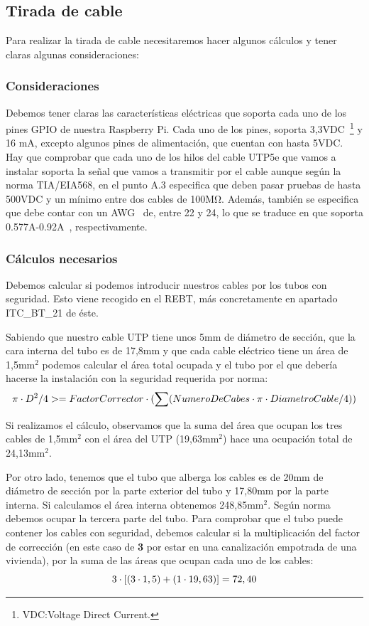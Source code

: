 \subsection{Tirada de cable}
Para realizar la tirada de cable necesitaremos hacer algunos cálculos y tener claras algunas consideraciones:

\subsubsection{Consideraciones}
Debemos tener claras las características eléctricas que soporta cada uno de los pines GPIO de nuestra Raspberry Pi. Cada uno de los pines, soporta 3,3VDC~\footnote{VDC:Voltage Direct Current.} y 16 mA, excepto algunos pines de alimentación, que cuentan con hasta 5VDC.
Hay que comprobar que cada uno de los hilos del cable UTP5e que vamos a instalar soporta la señal que vamos a transmitir por el cable aunque según la norma TIA/EIA568, en el punto A.3 especifica que deben pasar pruebas de hasta 500VDC y un mínimo entre dos cables de 100M\si{\ohm}. Además, también se especifica que debe contar con un AWG~\cite{wiki:DefAWG} de, entre 22 y 24, lo que se traduce en que soporta 0.577A-0.92A~\cite{wiki:TablaAWG}, respectivamente.

\subsubsection{Cálculos necesarios}
Debemos calcular si podemos introducir nuestros cables por los tubos con seguridad. Esto viene recogido en el REBT, más concretamente en apartado ITC\_BT\_21 de éste.

Sabiendo que nuestro cable UTP tiene unos 5mm de diámetro de sección, que la cara interna del tubo es de 17,8mm y que cada cable eléctrico tiene un área de 1,5mm$^{2}$ podemos calcular el área total ocupada y el tubo por el que debería hacerse la instalación con la seguridad requerida por norma:
\begin{equation}
\centering
\pi \cdot D^2/4 >= FactorCorrector \cdot (\sum(NumeroDeCabes \cdot \pi \cdot DiametroCable/4))
\end{equation}\label{E1}

Si realizamos el cálculo, observamos que la suma del área que ocupan los tres cables de 1,5mm$^{2}$ con el área del UTP (19,63mm$^{2}$) hace una ocupación total de 24,13mm$^{2}$.

Por otro lado, tenemos que el tubo que alberga los cables es de 20mm de diámetro de sección por la parte exterior del tubo y 17,80mm por la parte interna. Si calculamos el área interna obtenemos 248,85mm$^{2}$.
Según norma debemos ocupar la tercera parte del tubo. Para comprobar que el tubo puede contener los cables con seguridad, debemos calcular si la multiplicación del factor de corrección (en este caso de \textbf{3} por estar en una canalización empotrada de una vivienda), por la suma de las áreas que ocupan cada uno de los cables: 
\begin{equation}
\centering
3 \cdot [(3 \cdot 1,5)+(1 \cdot 19,63)]=72,40
\end{equation}\label{E2}

